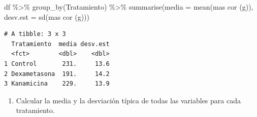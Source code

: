 \documentclass[
  a4paper,
]{scrreport}
\newenvironment{Shaded}{\begin{snugshade}}{\end{snugshade}}
\newcommand{\AttributeTok}[1]{\textcolor[rgb]{0.40,0.45,0.13}{#1}}
\newcommand{\FunctionTok}[1]{\textcolor[rgb]{0.28,0.35,0.67}{#1}}
\newcommand{\NormalTok}[1]{\textcolor[rgb]{0.00,0.23,0.31}{#1}}
\newcommand{\SpecialCharTok}[1]{\textcolor[rgb]{0.37,0.37,0.37}{#1}}
\newcommand{\StringTok}[1]{\textcolor[rgb]{0.13,0.47,0.30}{#1}}
\providecommand{\tightlist}{%
  \setlength{\itemsep}{0pt}\setlength{\parskip}{0pt}}\usepackage{longtable,booktabs,array}
\theoremstyle{definition}
\theoremstyle{definition}
\theoremstyle{remark}
\begin{document}
\begin{tcolorbox}[enhanced jigsaw, left=2mm, colframe=quarto-callout-note-color-frame, breakable, colback=white, title=\textcolor{quarto-callout-note-color}{\faInfo}\hspace{0.5em}{Solución}, toprule=.15mm, arc=.35mm, leftrule=.75mm, colbacktitle=quarto-callout-note-color!10!white, opacityback=0, coltitle=black, opacitybacktitle=0.6, rightrule=.15mm, bottomrule=.15mm, bottomtitle=1mm, toptitle=1mm, titlerule=0mm]

\begin{Shaded}
\begin{Highlighting}[]
\NormalTok{df }\SpecialCharTok{\%\textgreater{}\%}
    \FunctionTok{group\_by}\NormalTok{(Tratamiento) }\SpecialCharTok{\%\textgreater{}\%}
    \FunctionTok{summarise}\NormalTok{(}\AttributeTok{media =} \FunctionTok{mean}\NormalTok{(}\StringTok{\textasciigrave{}}\AttributeTok{mas cor (g)}\StringTok{\textasciigrave{}}\NormalTok{), }\AttributeTok{desv.est =} \FunctionTok{sd}\NormalTok{(}\StringTok{\textasciigrave{}}\AttributeTok{mas cor (g)}\StringTok{\textasciigrave{}}\NormalTok{))}
\end{Highlighting}
\end{Shaded}

\begin{verbatim}
# A tibble: 3 x 3
  Tratamiento  media desv.est
  <fct>        <dbl>    <dbl>
1 Control       231.     13.6
2 Dexametasona  191.     14.2
3 Kanamicina    229.     13.9
\end{verbatim}

\end{tcolorbox}

\begin{enumerate}
\def\labelenumi{\alph{enumi}.}
\setcounter{enumi}{5}
\tightlist
\item
  Calcular la media y la desviación típica de todas las variables para
  cada tratamiento.
\end{enumerate}
\end{document}
